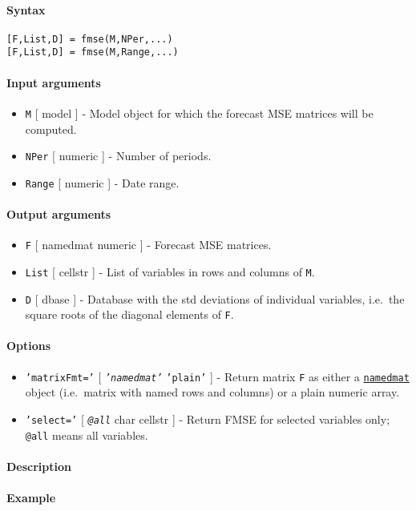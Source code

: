 


	\paragraph{Syntax}

\begin{verbatim}
[F,List,D] = fmse(M,NPer,...)
[F,List,D] = fmse(M,Range,...)
\end{verbatim}

\paragraph{Input arguments}

\begin{itemize}
\item
  \texttt{M} {[} model {]} - Model object for which the forecast MSE
  matrices will be computed.
\item
  \texttt{NPer} {[} numeric {]} - Number of periods.
\item
  \texttt{Range} {[} numeric {]} - Date range.
\end{itemize}

\paragraph{Output arguments}

\begin{itemize}
\item
  \texttt{F} {[} namedmat \textbar{} numeric {]} - Forecast MSE
  matrices.
\item
  \texttt{List} {[} cellstr {]} - List of variables in rows and columns
  of \texttt{M}.
\item
  \texttt{D} {[} dbase {]} - Database with the std deviations of
  individual variables, i.e.~the square roots of the diagonal elements
  of \texttt{F}.
\end{itemize}

\paragraph{Options}

\begin{itemize}
\item
  \texttt{'matrixFmt='} {[} \emph{\texttt{'namedmat'}} \textbar{}
  \texttt{'plain'} {]} - Return matrix \texttt{F} as either a
  \href{namedmat/Contents}{\texttt{namedmat}} object (i.e.~matrix with
  named rows and columns) or a plain numeric array.
\item
  \texttt{'select='} {[} \emph{\texttt{@all}} \textbar{} char \textbar{}
  cellstr {]} - Return FMSE for selected variables only; \texttt{@all}
  means all variables.
\end{itemize}

\paragraph{Description}

\paragraph{Example}



